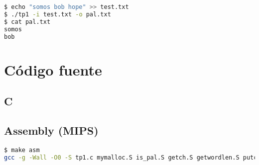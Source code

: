 \documentclass[10pt,a4paper]{article}
\begin{document}
\begin{lstlisting}[language=bash]
$ echo "somos bob hope" >> test.txt
$ ./tp1 -i test.txt -o pal.txt
$ cat pal.txt 
somos
bob
\end{lstlisting}

\newpage

\section{Código fuente}

\subsection{C}

\lstset{
	breaklines=true,
  	basicstyle=\footnotesize,
	numbers=left,
	captionpos=b,
	showspaces=false,
	title=\lstname
}



\newpage

\subsection{Assembly (MIPS)}

\lstset{
	breaklines=true,
  	basicstyle=\footnotesize,
}

\begin{lstlisting}[language=bash]
$ make asm
gcc -g -Wall -O0 -S tp1.c mymalloc.S is_pal.S getch.S getwordlen.S putch.S palindrome.S strcopy.S clear_buf.S
\end{lstlisting}
\end{document}
